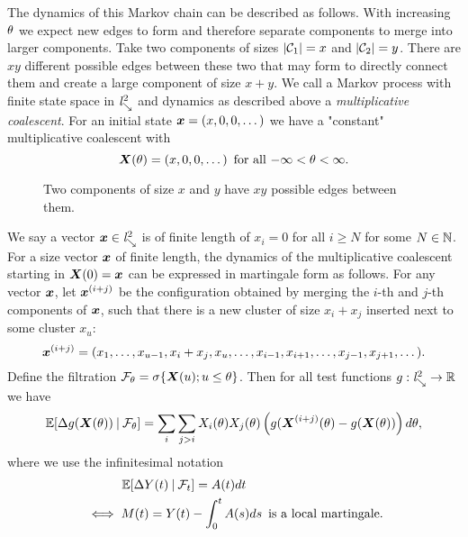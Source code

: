 The dynamics of this Markov chain can be described as follows.
With increasing $\theta$ we expect new edges to form and therefore separate components to merge into larger components.
Take two components of sizes $|\mathcal{C}_1| = x$ and $|\mathcal{C}_2| = y$.
There are $xy$ different possible edges between these two that may form to directly connect them 
and create a large component of size $x+y$.
We call a Markov process with finite state space in $\mathit{l}^2_{\searrow}$ and dynamics as described above a \emph{multiplicative coalescent}.
For an initial state $\boldsymbol{x} = (x, 0, 0, \dots)$ we have a "constant" multiplicative coalescent with
\begin{equation}
	\boldsymbol{X}(\theta) = (x, 0, 0, \dots) \enspace \text{for all $-\infty < \theta < \infty$}.
\end{equation}

\begin{figure}[H]
	\centering
	
	\caption{Two components of size $x$ and $y$ have $xy$ possible edges between them.}
	\label{F: components}
\end{figure} 

We say a vector $\boldsymbol{x} \in \mathit{l}^2_{\searrow}$ is of finite length of $x_i = 0$ for all $i \geq N$ for some $N \in \mathbb{N}$.
For a size vector $\boldsymbol{x}$ of finite length,
the dynamics of the multiplicative coalescent starting in $\boldsymbol{X}(0) = \boldsymbol{x}$ can be expressed in martingale form as follows.
For any vector $\boldsymbol{x}$, let $\boldsymbol{x}^{(i+j)}$ be the configuration obtained by merging the $i$-th and $j$-th components of $\boldsymbol{x}$,
such that there is a new cluster of size $x_i + x_j$ inserted next to some cluster $x_u$:
\begin{equation}
	\boldsymbol{x}^{(i+j)} = (x_1, \dots, x_{u-1}, x_i + x_j, x_u, \dots, x_{i-1}, x_{i+1}, \dots, x_{j-1}, x_{j+1}, \dots).
\end{equation}
Define the filtration $\mathcal{F}_{\theta} = \sigma\{ \boldsymbol{X}(u); u \leq \theta \}$.
Then for all test functions $g: \mathit{l}^2_{\searrow} \rightarrow \mathbb{R}$ we have
\begin{equation}
	\mathbb{E}[\Delta g(\boldsymbol{X}(\theta)) \: | \: \mathcal{F}_{\theta}]
	= \sum_i \sum_{j > i} X_i(\theta) X_j(\theta) \left( g(\boldsymbol{X}^{(i+j)}(\theta) - g(\boldsymbol{X}(\theta)) \right)d\theta,
\end{equation}
where we use the infinitesimal notation
\begin{equation}
\begin{aligned}
	&\qquad \quad \mathbb{E}[\Delta Y(t) \: | \: \mathcal{F}_{t}] = A(t)dt \\ 
	&\iff M(t) = Y(t) - \int_{0}^{t}A(s)ds \enspace \text{is a local martingale.}
\end{aligned}
\end{equation}

